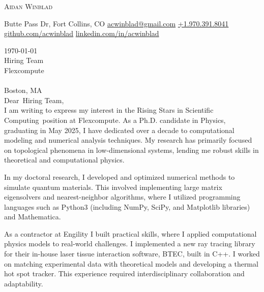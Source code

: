 \documentclass[12pt]{letter}
\makeatletter
\newcommand{\myname}{Aidan Winblad} %
\newcommand{\myemail}{acwinblad@gmail.com} %
\newcommand{\mylinkedin}{acwinblad} %
\newcommand{\mygithub}{acwinblad} %
\newcommand{\myphone}{+1.970.391.8041} %
\newcommand{\mylocation}{1007 Butte Pass Dr, Fort Collins, CO} %
\newcommand{\recipient}{Hiring Team} %
\newcommand{\greeting}{Dear} %
\newcommand{\position}{Rising Stars in Scientific Computing} %
\newcommand{\company}{Flexcompute} %
\newcommand{\street}{} %
\newcommand{\city}{Boston} %
\newcommand{\state}{MA} %
\newcommand{\zip}{} %
\makeatother
\begin{document}
\AddToShipoutPictureBG{%
\color{gr}
\AtPageUpperLeft{\rule[-1.4in]{\paperwidth}{1.3in}}
}

\begin{center}
{\fontsize{28}{0}\selectfont\scshape \myname}

\faMapMarker\enspace\mylocation\hfill
\href{mailto:\myemail}{\faEnvelope\enspace \myemail}\hfill
\href{tel:\myphone}{\faPhone\enspace \myphone}\hfill
\href{https://github.com/\mygithub}{\faGithubSquare\enspace github.com/\mygithub}\hfill
\href{https://linkedin.com/in/\mylinkedin}{\faLinkedinIn\enspace linkedin.com/in/\mylinkedin}\hfill
\end{center}

\vspace{0.2in}

\today\\

\vspace{-0.1in}\recipient\\
\company\\
\street\\
\city, \state\ \zip\\

\vspace{-0.1in}\greeting\ \recipient,\\

\vspace{-0.1in}\setlength\parindent{24pt}
I am writing to express my interest in the \position\ position at \company.
As a Ph.D. candidate in Physics, graduating in May 2025, I have dedicated over a decade to computational modeling and numerical analysis techniques.
My research has primarily focused on topological phenomena in low-dimensional systems, lending me robust skills in theoretical and computational physics.

In my doctoral research, I developed and optimized numerical methods to simulate quantum materials.
This involved implementing large matrix eigensolvers and nearest-neighbor algorithms, where I utilized programming languages such as Python3 (including NumPy, SciPy, and Matplotlib libraries) and Mathematica.

As a contractor at Engility I built practical skills, where I applied computational physics models to real-world challenges.
I implemented a new ray tracing library for their in-house laser tissue interaction software, BTEC, built in C++.
I worked on matching experimental data with theoretical models and developing a thermal hot spot tracker.
This experience required interdisciplinary collaboration and adaptability.
\end{document}
